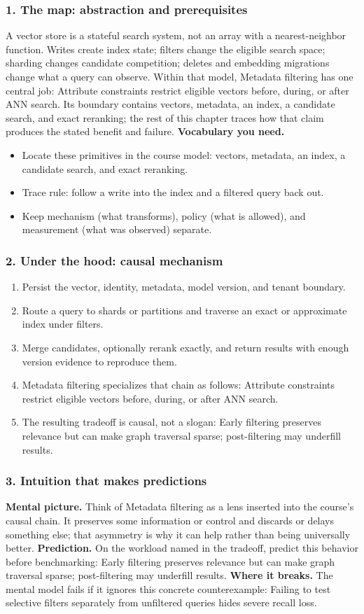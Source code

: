 \subsubsection*{1. The map: abstraction and prerequisites}
A vector store is a stateful search system, not an array with a nearest-neighbor function. Writes create index state; filters change the eligible search space; sharding changes candidate competition; deletes and embedding migrations change what a query can observe.
Within that model, Metadata filtering has one central job: Attribute constraints restrict eligible vectors before, during, or after ANN search. Its boundary contains vectors, metadata, an index, a candidate search, and exact reranking; the rest of this chapter traces how that claim produces the stated benefit and failure.
\textbf{Vocabulary you need.}\begin{itemize}
\item Locate these primitives in the course model: vectors, metadata, an index, a candidate search, and exact reranking.
\item Trace rule: follow a write into the index and a filtered query back out.
\item Keep mechanism (what transforms), policy (what is allowed), and measurement (what was observed) separate.
\end{itemize}
\subsubsection*{2. Under the hood: causal mechanism}\begin{enumerate}
\item Persist the vector, identity, metadata, model version, and tenant boundary.
\item Route a query to shards or partitions and traverse an exact or approximate index under filters.
\item Merge candidates, optionally rerank exactly, and return results with enough version evidence to reproduce them.
\item Metadata filtering specializes that chain as follows: Attribute constraints restrict eligible vectors before, during, or after ANN search.
\item The resulting tradeoff is causal, not a slogan: Early filtering preserves relevance but can make graph traversal sparse; post-filtering may underfill results.
\end{enumerate}
\subsubsection*{3. Intuition that makes predictions}
\textbf{Mental picture.} Think of Metadata filtering as a lens inserted into the course's causal chain. It preserves some information or control and discards or delays something else; that asymmetry is why it can help rather than being universally better.
\textbf{Prediction.} On the workload named in the tradeoff, predict this behavior before benchmarking: Early filtering preserves relevance but can make graph traversal sparse; post-filtering may underfill results.
\textbf{Where it breaks.} The mental model fails if it ignores this concrete counterexample: Failing to test selective filters separately from unfiltered queries hides severe recall loss.
